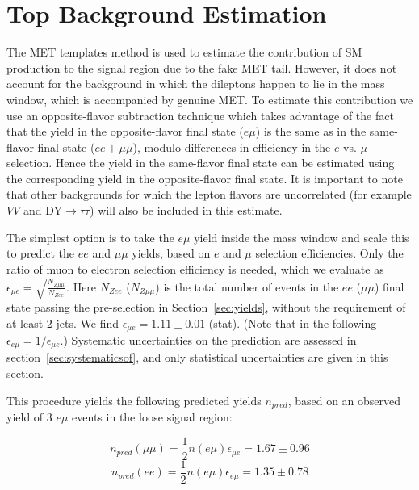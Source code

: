 


\section{Top Background Estimation}
\label{sec:topbkg}


The MET templates method is used to estimate the contribution of SM \Z production
 to the signal region due to the fake MET tail. However,
it does not account for the \ttbar background in which the dileptons happen to lie
 in the \Z mass window, which is accompanied by genuine MET. 
To estimate this contribution we use an opposite-flavor subtraction
technique which takes advantage of the fact that the \ttbar yield in the 
opposite-flavor final state ($e\mu$) is the same as in the same-flavor final state
($ee+\mu\mu$), modulo differences in efficiency in the $e$ vs. $\mu$ selection.
 Hence the \ttbar yield in the same-flavor final state can be estimated
using the corresponding yield in the opposite-flavor final state. 
It is important to note that other backgrounds for which the lepton flavors are
uncorrelated (for example $VV$ and DY$\rightarrow \tau\tau$) will also be included in
this estimate.

The simplest option
 is to take the $e\mu$ yield inside the \Z mass window and scale this
to predict the $ee$ and $\mu\mu$ yields, based on $e$ and $\mu$ selection efficiencies.
Only the ratio of muon to electron selection efficiency is needed, which we evaluate
 as $\epsilon_{\mu e} = \sqrt{\frac{N_{Z\mu\mu}}{N_{Zee}}}$. 
Here $N_{Zee}$ ($N_{Z\mu\mu}$) is the total number of events in the $ee$ ($\mu\mu$)
 final state passing the pre-selection in Section~\ref{sec:yields},
without the requirement of at least 2 jets. We find
 $\epsilon_{\mu e}=1.11 \pm 0.01$ (stat). (Note that in the following
 $\epsilon_{e\mu} = 1/\epsilon_{\mu e}$.)
Systematic uncertainties on the prediction are assessed in section~\ref{sec:systematicsof}, and only statistical uncertainties are given in this section.

This procedure yields the following predicted yields $n_{pred}$,
based on an observed yield of 3 $e\mu$ events in the loose signal region:

\begin{equation}
n_{pred}(\mu\mu) = \frac{1}{2}n(e\mu)\epsilon_{\mu e} = 1.67 \pm 0.96
\end{equation}
\begin{equation}
n_{pred}(ee)     = \frac{1}{2}n(e\mu)\epsilon_{e\mu} = 1.35 \pm 0.78
\end{equation}

